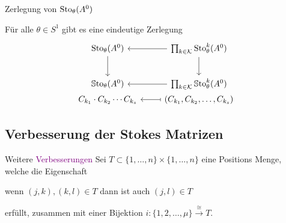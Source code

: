 \begin{frame}[fragile]{Zerlegung von $\operatorname{Sto}_\theta(A^0)$}
  \begin{thm}
    Für alle $\theta\in S^1$ gibt es eine eindeutige Zerlegung
    \[ \begin{tikzcd}[row sep=0cm]
        \Sto_\theta(A^0)
        \arrow{dddd}
        & \prod_{k\in\cK}\Sto_\theta^k(A^0) \lar
        \arrow{dddd}
        \\
        \hspace{1em}
        \\
        \hspace{1em}
        \\
        \hspace{1em}
        \\
        \SSto_\theta(A^0)
        & \prod_{k\in\cK}\SSto_\theta^k(A^0) \lar
        \\ C_{k_1}\cdot C_{k_2}\cdots C_{k_s}
        & \left(C_{k_1}, C_{k_2},\dots, C_{k_s}\right) \lar[maps to]
      \end{tikzcd} \]
  \end{thm}
\end{frame}

\subsection{Verbesserung der Stokes Matrizen}
\begin{frame}{Weitere \textcolor{purple}{Verbesserungen}}
  Sei $T\subset\{1,\dots,n\}\times\{1,\dots,n\}$ eine Positions Menge, welche
  die Eigenschaft
  \begin{einr}
    wenn $(j,k),(k,l)\in T$ dann ist auch $(j,l)\in T$
  \end{einr}
  erfüllt, zusammen mit einer Bijektion
  $i:\{1,2,\dots,\mu\}\overset{\cong}{\to}T$.
\end{frame}


